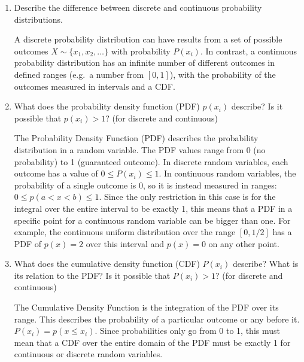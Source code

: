 %
%

\begin{enumerate}
    \item[a)] Describe the difference between discrete and continuous probability distributions.

    A discrete probability distribution can have results from a set of possible outcomes \(X \sim \{x_1, x_2, \ldots\}\) with probability \(P(x_i)\). In contrast, a continuous probability distribution has an infinite number of different outcomes in defined ranges (e.g.\ a number from \([0, 1]\)), with the probability of the outcomes measured in intervals and a CDF.

    \item[b)] What does the probability density function (PDF) \(p(x_i)\) describe? Is it possible that \(p(x_i) > 1\)? (for discrete and continuous)

    The Probability Density Function (PDF) describes the probability distribution in a random variable. The PDF values range from 0 (no probability) to 1 (guaranteed outcome). In discrete random variables, each outcome has a value of \(0 \le P(x_i) \le 1\). In continuous random variables, the probability of a single outcome is 0, so it is instead measured in ranges: \(0 \le p(a < x < b) \le 1\). Since the only restriction in this case is for the integral over the entire interval to be exactly 1, this means that a PDF in a specific point for a continuous random variable can be bigger than one. For example, the continuous uniform distribution over the range \([0, 1/2]\) has a PDF of \(p(x) = 2\) over this interval and \(p(x) = 0\) on any other point.

    \item[c)] What does the cumulative density function (CDF) \(P(x_i)\) describe? What is its relation to the PDF? Is it possible that \(P(x_i) > 1\)? (for discrete and continuous)

    The Cumulative Density Function is the integration of the PDF over its range. This describes the probability of a particular outcome or any before it. \(P(x_i) = p(x \le x_i)\). Since probabilities only go from 0 to 1, this must mean that a CDF over the entire domain of the PDF must be exactly 1 for continuous or discrete random variables.
\end{enumerate}

%

